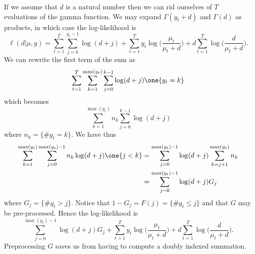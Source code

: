 \documentclass[11pt]{article}
\begin{document}
If we assume that $d$ is a natural number then we can rid ourselves of $T$
evaluations of the gamma function.  We may expand $\Gamma(y_t + d)$ and
$\Gamma(d)$ as products, in which case the log-likelihood is
\[
\ell(d|\mu, y) = \sum_{t=1}^T \sum_{j=0}^{y_t-1} \log(d + j) + 
\sum_{t=1}^T y_t \log \big( \frac{\mu_t}{\mu_t + d} \Big) +
d \sum_{t=1}^T \log \Big( \frac{d}{\mu_t + d} \Big).
\]
We can rewrite the first term of the sum as
\[
\sum_{t=1}^T \sum_{k=1}^{\max(y_t)} \sum_{j=0}^{k-1} \log(d+j) \one \{y_t = k\}
\]
which becomes
\[
\sum_{k=1}^{\max(y_t)} n_k \sum_{j=0}^{k-1} \log(d+j)
\]
where $n_k = \{ \# y_t = k \}$.  We have thus
\begin{align*}
\sum_{k=1}^{\max(y_t)} \sum_{j=0}^{\max(y_t)-1} n_k \log(d+j) \one\{j < k\}
& = 
\sum_{j=0}^{\max(y_t)-1} \log(d+j) \sum_{k=j+1}^{\max(y_t)} n_k \\
& = \sum_{j=0}^{\max(y_t)-1} \log(d+j) G_j
\end{align*}
where $G_j = \{ \# y_t > j \}$.  Notice that $1-G_j = F(j) = \{\# y_t \leq j\}$
and that $G$ may be pre-processed.  Hence the log-likelihood is
\[
\sum_{j=0}^{\max(y_t)-1} \log(d+j) G_j + 
\sum_{t=1}^T y_t \log \big( \frac{\mu_t}{\mu_t + d} \Big) +
d \sum_{t=1}^T \log \Big( \frac{d}{\mu_t + d} \Big).
\]
Preprocessing $G$ saves us from having to compute a doubly indexed summation.


{}

\end{document}
